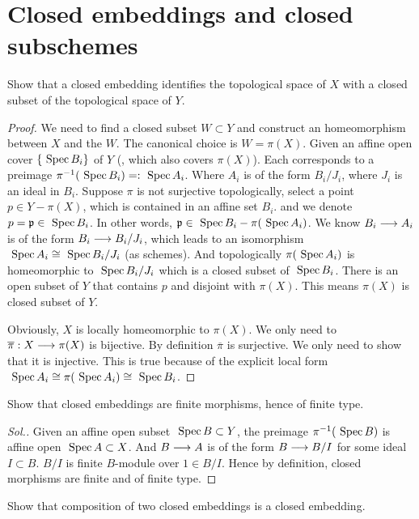 \documentclass[11pt]{book} %
\begin{document}
\section{Closed embeddings and closed subschemes}
\begin{exr}\label{chap8exr:8.1.A}
Show that a closed embedding identifies the topological space of $X$ with a closed subset of the topological space of $Y$. 
\end{exr}
\begin{proof}
We need to find a closed subset $W\subset Y$ and construct an homeomorphism between $X$ and the $W$. The canonical choice is $W=\pi(X)$. Given an affine open cover $\{\text{ Spec\,} B_i\}$ of $Y$ (, which also covers $\pi(X)$). Each corresponds to a preimage $\pi^{-1}(\text{ Spec\,} B_i)=:\text{ Spec\,} A_i$. Where $A_i$ is of the form $B_i/J_i$, where $J_i$ is an ideal in $B_i$. Suppose $\pi$ is not surjective topologically, select a point $p\in Y-\pi(X)$, which is contained in an affine set $B_i$. and we denote $p={\mathfrak p}\in \text{ Spec\,} B_i$. In other words, ${\mathfrak p}\in \text{ Spec\,} B_i-\pi(\text{ Spec\,} A_i)$. We know $B_i\longrightarrow A_i$ is of the form $B_i\longrightarrow B_i/J_i$, which leads to an isomorphism $\text{ Spec\,} A_i\cong \text{ Spec\,} B_i/J_i$ (as schemes). And topologically $\pi(\text{ Spec\,} A_i)$ is homeomorphic to $\text{ Spec\,} B_i/J_i$ which is a closed subset of $\text{ Spec\,} B_i$. There is an open subset of $Y$ that contains $p$ and disjoint with $\pi(X)$. This means $\pi(X)$ is closed subset of $Y$.

Obviously, $X$ is locally homeomorphic to $\pi(X)$. We only need to $\overline{\pi}:X\longrightarrow \pi(X)$ is bijective. By definition $\overline{\pi}$ is surjective. We only need to show that it is injective. This is true because of the explicit local form $\text{ Spec\,} A_i\cong \pi(\text{ Spec\,} A_i)\cong \text{ Spec\,} B_i$.
\end{proof}
\begin{exr}\label{chap8exr:closed_embeddings_finite}
Show that closed embeddings are finite morphisms, hence of finite type.
\end{exr}
\begin{proof}[Sol.]
Given an affine open subset $\text{ Spec\,} B\subset Y$, the preimage $\pi^{-1}(\text{ Spec\,} B)$ is affine open $\text{ Spec\,} A\subset X$.  And $B\longrightarrow A$ is  of the form $B\longrightarrow B/I$ for some ideal $I\subset B$. $B/I$ is finite  $B$-module over $1\in B/I$. Hence by definition, closed morphisms are finite and of finite type.
\end{proof}
\begin{exr}
Show that composition of two closed embeddings is a closed embedding.
\end{exr}
\end{document}
